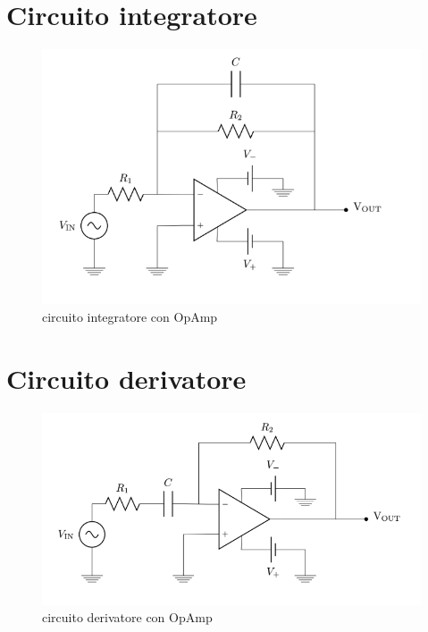 \documentclass[10pt,a4paper]{article}
\begin{document}
\section{Circuito integratore}
\begin{figure}[!htb]
  \centering
  \includegraphics[scale=0.5]{integratore.png}
\caption{circuito integratore con OpAmp}
\end{figure}
\section{Circuito derivatore}
\begin{figure}[!htb]
  \centering
  \includegraphics[scale=0.5]{derivatore.png}
\caption{circuito derivatore con OpAmp}
\end{figure}
\end{document}
